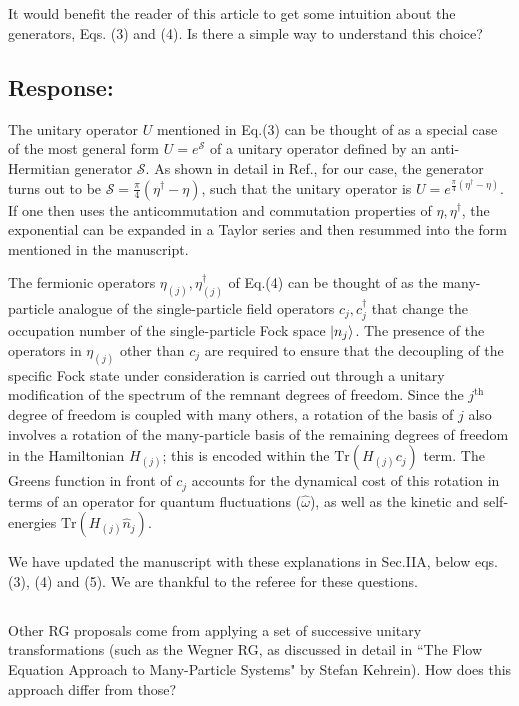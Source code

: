 \documentclass{article}
\newcommand{\response}[1]{{\color{blue}\subsection*{Response:}{#1}}}
\newcommand{\point}[1]{\subsection{}{#1}}
\begin{document}
\point{
It would benefit the reader of this article to get some intuition about the generators, Eqs. (3) and (4). Is there a simple way to understand this choice?}

\response{The unitary operator \(U\) mentioned in Eq.(3) can be thought of as a special case of the most general form \(U = e^\mathcal{S}\) of a unitary operator defined by an anti-Hermitian generator \(\mathcal{S}\). As shown in detail in Ref.\cite{anirbanurg1}, for our case, the generator turns out to be \(\mathcal{S} = \frac{\pi}{4}\left( \eta^\dagger - \eta \right) \), such that the unitary operator is \(U = e^{\frac{\pi}{4}\left(\eta^\dagger - \eta\right) }\). If one then uses the anticommutation and commutation properties of \(\eta,\eta^\dagger\), the exponential can be expanded in a Taylor series and then resummed into the form mentioned in the manuscript.
\par\noindent
The fermionic operators \(\eta_{(j)},\eta^\dagger_{(j)}\) of Eq.(4) can be thought of as the many-particle analogue of the single-particle field operators \(c_j,c^\dagger_j\) that change the occupation number of the single-particle Fock space \(\ket{n_j}\). The presence of the operators in $\eta_{(j)}$ other than $c_j$ are required to ensure that the decoupling of the specific Fock state under consideration is carried out through a unitary modification of the spectrum of the remnant degrees of freedom. Since the \(j^\text{th}\) degree of freedom is coupled with many others, a rotation of the basis of \(j\) also involves a rotation of the many-particle basis of the remaining degrees of freedom in the Hamiltonian \(H_{(j)}\); this is encoded within the \(\text{Tr}\left(H_{(j)} c_j\right) \) term. The Greens function in front of $c_j$ accounts for the dynamical cost of this rotation in terms of an operator for quantum fluctuations (\(\hat \omega\)), as well as the kinetic and self-energies \(\text{Tr}\left( H_{(j)}\hat n_j \right) \).
\par\noindent
We have updated the manuscript with these explanations in Sec.IIA, below eqs.(3), (4) and (5). We are thankful to the referee for these questions.
}

\point{Other RG proposals come from applying a set of successive unitary transformations (such as the Wegner RG, as discussed in detail in ``The Flow Equation Approach to Many-Particle Systems" by Stefan Kehrein). How does this approach differ from those?}
\end{document}
